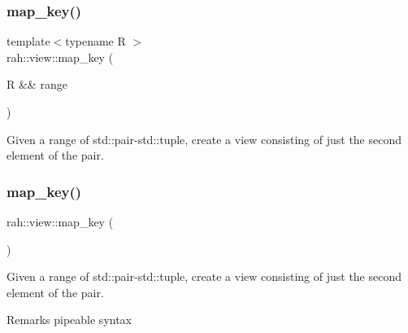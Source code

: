 \subsubsection{\texorpdfstring{map\_key()}{map\_key()}\hspace{0.1cm}{\footnotesize\ttfamily [1/2]}}
{\footnotesize\ttfamily template$<$typename R $>$ \\
rah\+::view\+::map\+\_\+key (\begin{DoxyParamCaption}\item[{R \&\&}]{range }\end{DoxyParamCaption})}



Given a range of std\+::pair-\/std\+::tuple, create a view consisting of just the second element of the pair. 


\begin{DoxyCodeInclude}{0}
\end{DoxyCodeInclude}
\mbox{\label{namespacerah_1_1view_aa42d84e34eaf06e2d04d650d1483ac68}} 
\subsubsection{\texorpdfstring{map\_key()}{map\_key()}\hspace{0.1cm}{\footnotesize\ttfamily [2/2]}}
{\footnotesize\ttfamily rah\+::view\+::map\+\_\+key (\begin{DoxyParamCaption}{ }\end{DoxyParamCaption})}



Given a range of std\+::pair-\/std\+::tuple, create a view consisting of just the second element of the pair. 

\begin{DoxyRemark}{Remarks}
pipeable syntax
\end{DoxyRemark}

